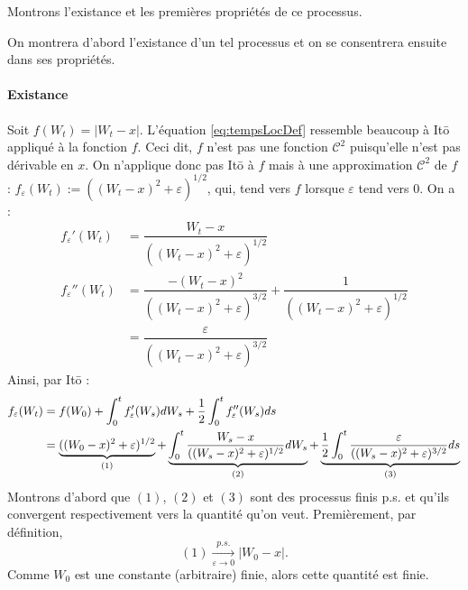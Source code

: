 \documentclass[openany]{book}
\makeatletter
\newcommand{\1}{\mathbbm{1}}
\renewenvironment{proof}[1][\textbf{\textit{Démonstration}}]{%
  \par\pushQED{\qed}%
  \normalfont\topsep6\p@\@plus6\p@\relax
  \trivlist\item[\hskip\labelsep
    #1\@addpunct{.}]\ignorespaces
}{%
  \popQED\endtrivlist\@endpefalse
}
\theoremstyle{thmfont}
\theoremstyle{deffont}
\theoremstyle{thmfont}
\theoremstyle{deffont}
\makeatother
\begin{document}
Montrons l'existance et les premières propriétés de ce processus.
\begin{proof} On montrera d'abord l'existance d'un tel processus et on se consentrera ensuite dans ses propriétés.

  \paragraph{Existance}
  Soit $f(W_t) = |W_t-x|$. L'équation \eqref{eq:tempsLocDef} ressemble beaucoup à Itō appliqué à la fonction $f$. Ceci dit, $f$ n'est pas une fonction $\mathcal C^2$ puisqu'elle n'est pas dérivable en $x$. On n'applique donc pas Itō à $f$ mais à une approximation $\mathcal C^2$ de $f$ : $f_\varepsilon(W_t):= ((W_t-x)^2 +\varepsilon)^{1/2}$, qui, tend vers $f$ lorsque $\varepsilon$ tend vers 0. On a :
  \begin{align*}
    f_\varepsilon'(W_t) &= \dfrac{W_t-x}{((W_t-x)^2 +\varepsilon)^{1/2}}\\
    f_\varepsilon''(W_t)&= \dfrac{-(W_t-x)^2}{((W_t-x)^2 +\varepsilon)^{3/2}} + \dfrac{1}{((W_t-x)^2 +\varepsilon)^{1/2}}\\
              &= \dfrac{\varepsilon}{((W_t-x)^2 +\varepsilon)^{3/2}}
  \end{align*}
  Ainsi, par Itō :
  \begin{align}
    f_\varepsilon(W_t) &= f(W_0) + \int_0^t f_\varepsilon'(W_s) dW_s + \dfrac{1}{2} \int_0^t f_\varepsilon''(W_s) ds\label{eq:tempsLocApprox}\\
             &= \underbrace{((W_0 -x)^2 + \varepsilon)^{1/2}}_{(1)} + \underbrace{\int_0^t \dfrac{W_s-x}{((W_s-x)^2 +\varepsilon)^{1/2}}dW_s}_{(2)} + \underbrace{\dfrac{1}{2} \int_0^t \dfrac{\varepsilon}{((W_s-x)^2 +\varepsilon)^{3/2}} ds}_{(3)} \notag
  \end{align}
  Montrons d'abord que $(1)$, $(2)$ et $(3)$ sont des processus finis p.s. et qu'ils convergent respectivement vers la quantité qu'on veut. Premièrement, par définition,
  $$(1) \xrightarrow[\varepsilon \to 0]{p.s.}  |W_0 -x|.$$
  \noindent Comme $W_0$ est une constante (arbitraire) finie, alors cette quantité est finie.\\


\end{proof}
\end{document}
